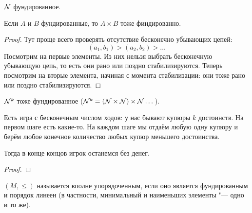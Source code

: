 
\begin{exmp}\label{well_founded_no}
	$\mathcal{N}$ фундированное.
\end{exmp}
\begin{exmp}
	Если $A$ и $B$ фундированные, то $A \times B$ тоже финдированно.
\end{exmp}
\begin{proof}
	Тут проще всего проверять отсутствие бесконечно убывающих цепей:
	\[ (a_1, b_1) > (a_2, b_2) > \dots \]
	Посмотрим на первые элементы.
	Из них нельзя выбрать бесконечную убывающую цепь, то есть они рано или поздно стабилизируются.
	Теперь посмотрим на вторые элемента, начиная с момента стабилизации: они тоже рано или поздно
	стабилизируются.
\end{proof}
\begin{exmp}
	$\mathcal{N}^k$ тоже фундированное ($\mathcal{N}^k=(\mathcal{N}\times\mathcal{N})\times\mathcal{N}\dots$).
\end{exmp}
\begin{exmp}
	Есть игра с бесконечным числом ходов: у нас бывают купюры $k$ достоинств.
	На первом шаге есть какие-то.
	На каждом шаге мы отдаём любую одну купюру и берём любое конечное количество
	любых купюр меньшего достоинства.

	Тогда в конце концов игрок останемся без денег.
\end{exmp}
\begin{proof}
\end{proof}

\begin{Def}
	$(M, \le)$ называется вполне упорядоченным, если оно является фундированным и
	порядок линеен (в частности, минимальный и наименьших элементы "--- одно и то же).
\end{Def}

